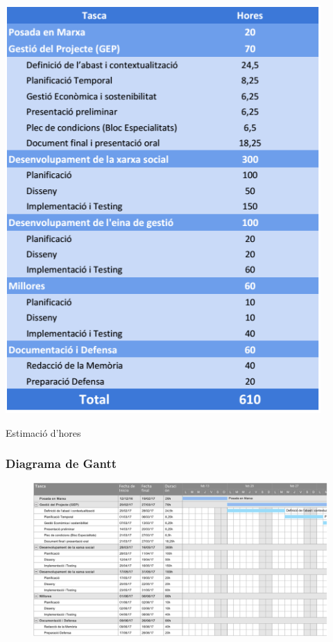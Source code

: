 \documentclass[11pt,catalan,listoffigures,listoftables]{tfgetsinf}
\begin{document}
\begin{table}[h]
\centering
\includegraphics[width=12cm]{images/taula1}
\caption[Taula 6.1]{Estimació d'hores}
\centering
\end{table}

\newpage

\subsubsection{Diagrama de Gantt}

\begin{figure}[h]
\includegraphics[width=12cm]{images/image2}
\centering
\end{figure}
\end{document}
